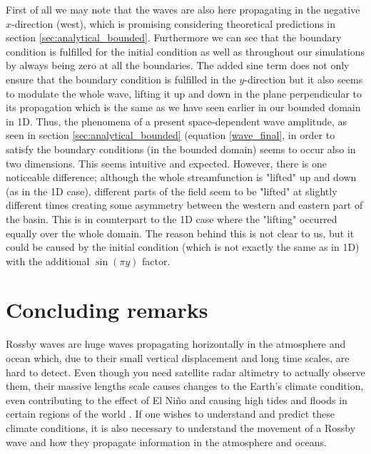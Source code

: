 \documentclass[12pt]{article}
\numberwithin{figure}{section}
\numberwithin{table}{section}
\begin{document}
\noindent First of all we may note that the waves are also here propagating in the negative $x$-direction (west), which is promising considering theoretical predictions in section \ref{sec:analytical_bounded}. Furthermore we can see that the boundary condition is fulfilled for the initial condition as well as throughout our simulations by always being zero at all the boundaries. The added sine term does not only ensure that the boundary condition is fulfilled in the $y$-direction but it also seems to modulate the whole wave, lifting it up and down in the plane perpendicular to its propagation which is the same as we have seen earlier in our bounded domain in 1D. Thus, the phenomena of a present space-dependent wave amplitude, as seen in section \ref{sec:analytical_bounded} (equation \eqref{wave_final}, in order to satisfy the boundary conditions (in the bounded domain) seems to occur also in two dimensions. This seems intuitive and expected. However, there is one noticeable difference; although the whole streamfunction is "lifted" up and down (as in the 1D case), different parts of the field seem to be "lifted" at slightly different times creating some asymmetry between the western and eastern part of the basin. This is in counterpart to the 1D case where the "lifting" occurred equally over the whole domain. The reason behind this is not clear to us, but it could be caused by the initial condition (which is not exactly the same as in 1D) with the additional $\sin(\pi y)$ factor. \\








\section{Concluding remarks}

\noindent Rossby waves are huge waves propagating horizontally in the atmosphere and ocean which, due to their small vertical displacement and long time scales, are hard to detect. Even though you need satellite radar altimetry to actually observe them, their massive lengths scale causes changes to the Earth's climate condition, even contributing to the effect of El Ni\~no and causing high tides and floods in certain regions of the world \cite{Rossby}. If one wishes to understand and predict these climate conditions, it is also necessary to understand the movement of a Rossby wave and how they propagate information in the atmosphere and oceans.\\
\end{document}
